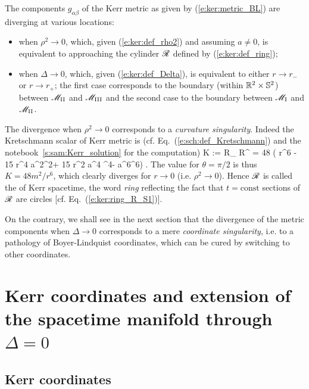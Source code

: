 The components $g_{\alpha\beta}$ of the Kerr metric as given by  (\ref{e:ker:metric_BL})
are diverging at various locations:
\begin{itemize}
\item when $\rho^2\rightarrow 0$, which, given (\ref{e:ker:def_rho2})
and assuming $a\not=0$, is equivalent to approaching
the cylinder $\mathscr{R}$ defined by (\ref{e:ker:def_ring});
\item when $\Delta\rightarrow 0$, which, given (\ref{e:ker:def_Delta}), is equivalent to either $r\rightarrow r_-$
or $r\rightarrow r_+$; the first case corresponds to the boundary (within $\mathbb{R}^2\times\mathbb{S}^2$)
between $\mathscr{M}_{\rm II}$ and $\mathscr{M}_{\rm III}$ and the second case to the boundary
between $\mathscr{M}_{\rm I}$ and $\mathscr{M}_{\rm II}$.
\end{itemize}
The divergence when $\rho^2\rightarrow 0$ corresponds to a
\emph{curvature singularity}.
Indeed the Kretschmann scalar of Kerr metric is (cf.
Eq.~(\ref{e:sch:def_Kretschmann}) and the notebook~\ref{s:sam:Kerr_solution} for the computation)
\be
    K := R_{\mu\nu\rho\sigma} R^{\mu\nu\rho\sigma}
     = 48  \left( r^6 - 15 r^4 a^2\cos^2\th + 15 r^2 a^4 \cos^4\th - a^6\cos^6\th \right) .
\ee
The value for $\theta=\pi/2$ is thus $K = 48 m^2 / r^6$, which clearly diverges
for $r\rightarrow 0$ (i.e. $\rho^2\rightarrow 0$).
Hence $\mathscr{R}$ is called the
of Kerr spacetime, the word \emph{ring} reflecting the fact that $t=\mathrm{const}$
sections of $\mathscr{R}$ are circles [cf. Eq.~(\ref{e:ker:ring_R_S1})].

On the contrary, we shall see in the next section that the divergence
of the metric components when $\Delta\rightarrow 0$ corresponds to
a mere
\emph{coordinate singularity},
i.e. to a pathology of Boyer-Lindquist coordinates, which can be cured by switching to
other coordinates.


\section{Kerr coordinates and extension of the spacetime manifold through $\Delta=0$}
\label{s:ker:extension}

\subsection{Kerr coordinates} \label{s:ker:Kerr_coord}

